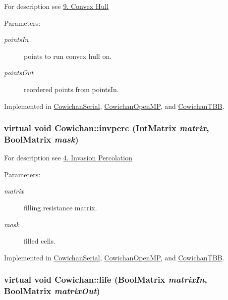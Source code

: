 For description see \hyperlink{index_hull_sec}{9. Convex Hull} \begin{Desc}
\item[Parameters:]
\begin{description}
\item[{\em pointsIn}]points to run convex hull on. \item[{\em pointsOut}]reordered points from pointsIn. \end{description}
\end{Desc}


Implemented in \hyperlink{class_cowichan_serial_e75cedf0a296dd7ad3dc41cadc51776f}{CowichanSerial}, \hyperlink{class_cowichan_open_m_p_cb444dd3e2c0f1f27f4135de0279d09e}{CowichanOpenMP}, and \hyperlink{class_cowichan_t_b_b_0d23aa05dc21fd9e8b033769097b4b18}{CowichanTBB}.\hypertarget{class_cowichan_ea126792a31e54a8722663b7ea768955}{
\subsubsection[{invperc}]{\setlength{\rightskip}{0pt plus 5cm}virtual void Cowichan::invperc ({\bf IntMatrix} {\em matrix}, \/  {\bf BoolMatrix} {\em mask})}}
\label{class_cowichan_ea126792a31e54a8722663b7ea768955}


For description see \hyperlink{index_invperc_sec}{4. Invasion Percolation} \begin{Desc}
\item[Parameters:]
\begin{description}
\item[{\em matrix}]filling resistance matrix. \item[{\em mask}]filled cells. \end{description}
\end{Desc}


Implemented in \hyperlink{class_cowichan_serial_9b1cf3fcbb40498609826433b8ea2f6a}{CowichanSerial}, \hyperlink{class_cowichan_open_m_p_4824c6b8509b5da835fbc5f64eb3e063}{CowichanOpenMP}, and \hyperlink{class_cowichan_t_b_b_e4f9f8c31feea9b3a167fc2880a97610}{CowichanTBB}.\hypertarget{class_cowichan_d449595ef2fe934bdd128ac8b1f51d07}{
\subsubsection[{life}]{\setlength{\rightskip}{0pt plus 5cm}virtual void Cowichan::life ({\bf BoolMatrix} {\em matrixIn}, \/  {\bf BoolMatrix} {\em matrixOut})}}
\label{class_cowichan_d449595ef2fe934bdd128ac8b1f51d07}


